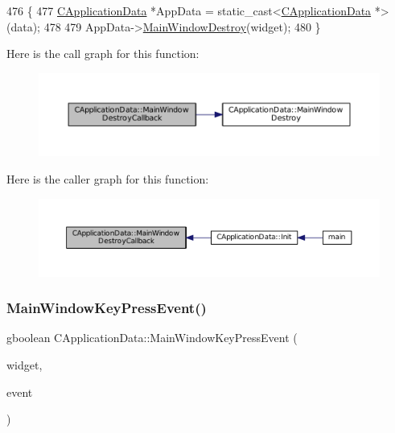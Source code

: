 \begin{DoxyCode}
476                                                                                 \{
477     \hyperlink{classCApplicationData}{CApplicationData} *AppData = \textcolor{keyword}{static\_cast<}\hyperlink{classCApplicationData}{CApplicationData} *\textcolor{keyword}{>}(data);
478 
479     AppData->\hyperlink{classCApplicationData_a202437b2380956a5519722937cd9f96a}{MainWindowDestroy}(widget);
480 \}
\end{DoxyCode}
Here is the call graph for this function\+:\nopagebreak
\begin{figure}[H]
\begin{center}
\leavevmode
\includegraphics[width=350pt]{classCApplicationData_a379327c78dc57aa9dcef77e1b98efa2d_cgraph}
\end{center}
\end{figure}
Here is the caller graph for this function\+:\nopagebreak
\begin{figure}[H]
\begin{center}
\leavevmode
\includegraphics[width=350pt]{classCApplicationData_a379327c78dc57aa9dcef77e1b98efa2d_icgraph}
\end{center}
\end{figure}
\hypertarget{classCApplicationData_a9b451765c93ecf00322f5450d29bfffe}{}\label{classCApplicationData_a9b451765c93ecf00322f5450d29bfffe} 
\subsubsection{\texorpdfstring{Main\+Window\+Key\+Press\+Event()}{MainWindowKeyPressEvent()}}
{\footnotesize\ttfamily gboolean C\+Application\+Data\+::\+Main\+Window\+Key\+Press\+Event (\begin{DoxyParamCaption}\item[{Gtk\+Widget $\ast$}]{widget,  }\item[{Gdk\+Event\+Key $\ast$}]{event }\end{DoxyParamCaption})\hspace{0.3cm}{\ttfamily [protected]}}



